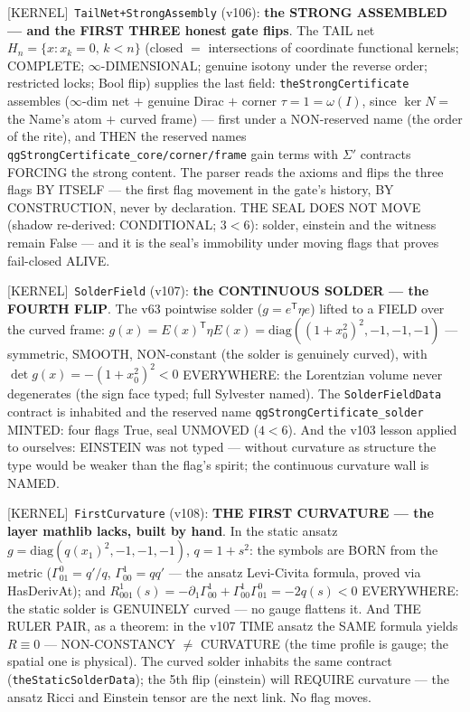 \documentclass[11pt]{article}
\providecommand{\kernelmk}[1]{\textsf{[KERNEL]}~\texttt{#1}}\providecommand{\knownmk}[1]{\textsf{[KNOWN]}~{#1}}\providecommand{\statusmk}[1]{\textsf{[#1]}}
\theoremstyle{definition}\newtheorem{deriv}{Derivation}
\begin{document}
\kernelmk{TailNet+\allowbreak StrongAssembly} (v106): \textbf{the STRONG ASSEMBLED --- and the FIRST THREE honest gate flips}. The TAIL net $H_n=\{x:x_k=0,\,k<n\}$ (closed $=$ intersections of coordinate functional kernels; COMPLETE; $\infty$-DIMENSIONAL; genuine isotony under the reverse order; restricted locks; Bool flip) supplies the last field: \texttt{theStrongCertificate} assembles ($\infty$-dim net $+$ genuine Dirac $+$ corner $\tau=1=\omega(I)$, since $\ker N=$ the Name's atom $+$ curved frame) --- first under a NON-reserved name (the order of the rite), and THEN the reserved names \texttt{qgStrongCertificate\_core/corner/frame} gain terms with $\Sigma'$ contracts FORCING the strong content. The parser reads the axioms and flips the three flags BY ITSELF --- the first flag movement in the gate's history, BY CONSTRUCTION, never by declaration. THE SEAL DOES NOT MOVE (shadow re-derived: CONDITIONAL; $3<6$): solder, einstein and the witness remain False --- and it is the seal's immobility under moving flags that proves fail-closed ALIVE.

\kernelmk{SolderField} (v107): \textbf{the CONTINUOUS SOLDER --- the FOURTH FLIP}. The v63 pointwise solder ($g=e^{\mathsf{T}}\eta e$) lifted to a FIELD over the curved frame: $g(x)=E(x)^{\mathsf{T}}\eta E(x)=\mathrm{diag}((1+x_0^2)^2,-1,-1,-1)$ --- symmetric, SMOOTH, NON-constant (the solder is genuinely curved), with $\det g(x)=-(1+x_0^2)^2<0$ EVERYWHERE: the Lorentzian volume never degenerates (the sign face typed; full Sylvester named). The \texttt{SolderFieldData} contract is inhabited and the reserved name \texttt{qgStrongCertificate\_solder} MINTED: four flags True, seal UNMOVED ($4<6$). And the v103 lesson applied to ourselves: EINSTEIN was not typed --- without curvature as structure the type would be weaker than the flag's spirit; the continuous curvature wall is NAMED.

\kernelmk{FirstCurvature} (v108): \textbf{THE FIRST CURVATURE --- the layer mathlib lacks, built by hand}. In the static ansatz $g=\mathrm{diag}(q(x_1)^2,-1,-1,-1)$, $q=1+s^2$: the symbols are BORN from the metric ($\Gamma^0_{01}=q'/q$, $\Gamma^1_{00}=qq'$ --- the ansatz Levi-Civita formula, proved via HasDerivAt); and $R^1_{001}(s)=-\partial_1\Gamma^1_{00}+\Gamma^1_{00}\Gamma^0_{01}=-2q(s)<0$ EVERYWHERE: the static solder is GENUINELY curved --- no gauge flattens it. And THE RULER PAIR, as a theorem: in the v107 TIME ansatz the SAME formula yields $R\equiv 0$ --- NON-CONSTANCY $\neq$ CURVATURE (the time profile is gauge; the spatial one is physical). The curved solder inhabits the same contract (\texttt{theStaticSolderData}); the 5th flip (einstein) will REQUIRE curvature --- the ansatz Ricci and Einstein tensor are the next link. No flag moves.
\end{document}
